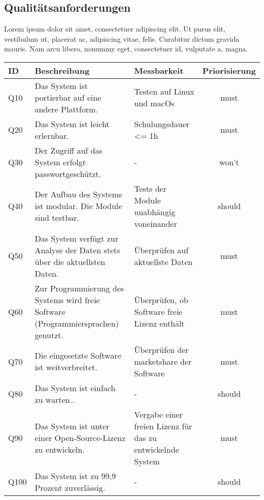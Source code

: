 \subsection{Qualitätsanforderungen}
Lorem ipsum dolor sit amet, consectetuer adipiscing elit. Ut purus elit, vestibulum ut, 
placerat ac, adipiscing vitae, felis. Curabitur dictum gravida mauris. Nam arcu libero, nonummy eget, consectetuer id, vulputate a, magna.
\begingroup
\setlength{\tabcolsep}{12pt} %
\renewcommand{\arraystretch}{1.5} 
\begin{table}[H]
    \centering
    \begin{adjustbox}{max width=\textwidth}
    \begin{tabular}{lp{8cm}p{5cm}c}
       \toprule
       \textbf{ID}          & \textbf{Beschreibung} & \textbf{Messbarkeit} & \textbf{Priorisierung}\\
       \midrule
        Q10                               &Das System ist portierbar auf eine andere Plattform. & Testen auf Linux und macOs & must\\
        Q20                               &Das System ist leicht erlernbar.& Schulungsdauer <= 1h  & must\\
        Q30                               &Der Zugriff auf das System erfolgt passwortgeschützt. & -  & won't\\
        Q40                               &Der Aufbau des Systems ist modular. Die Module sind testbar. & Tests der Module unabhängig voneinander & should\\
        Q50                               &Das System verfügt zur Analyse der Daten stets über die aktuellsten Daten. & Überprüfen auf aktuellste Daten & must\\
        Q60                               &Zur Programmierung des Systems wird freie Software (Programmiersprachen) genutzt. & Überprüfen, ob Software freie Lizenz enthält  & must\\
        Q70                               &Die eingesetzte Software ist weitverbreitet. & Überprüfen der marketshare der Software & must\\
        Q80                               &Das System ist einfach zu warten.. & - & should\\
        Q90                               &Das System ist unter einer Open-Source-Lizenz zu entwickeln. & Vergabe einer freien Lizenz für das zu entwickelnde System  & must\\
        Q100                              &Das System ist zu 99,9 Prozent zuverlässig.  &- & should\\

\end{tabular}
\end{adjustbox}
\end{table}
